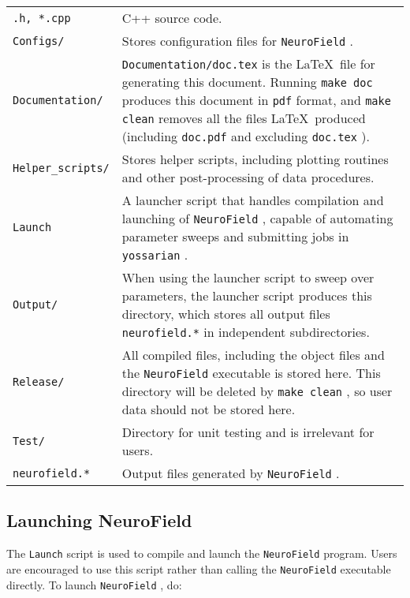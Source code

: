 \documentclass[12pt,a4paper]{article}
\newcommand{\type}[1]{ {\small\small\tt #1} }
\begin{document}
\begin{tabular}{l p{12cm}}
\type{*.h, *.cpp}& C++ source code.\\
\type{Configs/}& Stores configuration files for \type{NeuroField}.\\
\type{Documentation/}& \type{Documentation/doc.tex} is the \LaTeX\ file for generating this document. Running \type{make doc} produces this document in \type{pdf} format, and \type{make clean} removes all the files \LaTeX\ produced (including \type{doc.pdf} and excluding \type{doc.tex}).\\
\type{Helper\_scripts/}& Stores helper scripts, including plotting routines and other post-processing of data procedures.\\
\type{Launch}& A launcher script that handles compilation and launching of \type{NeuroField}, capable of automating parameter sweeps and submitting jobs in \type{yossarian}.\\
\type{Output/}& When using the launcher script to sweep over parameters, the launcher script produces this directory, which stores all output files \type{neurofield.*} in independent subdirectories.\\
\type{Release/}& All compiled files, including the object files and the \type{NeuroField} executable is stored here. This directory will be deleted by \type{make clean}, so user data should not be stored here.\\
\type{Test/}& Directory for unit testing and is irrelevant for users.\\
\type{neurofield.*}& Output files generated by \type{NeuroField}.
\end{tabular}

\subsection{Launching NeuroField}
\label{sec:launch}

The \type{Launch} script is used to compile and launch the \type{NeuroField} program. Users are encouraged to use this script rather than calling the \type{NeuroField} executable directly. To launch \type{NeuroField}, do:
\end{document}
